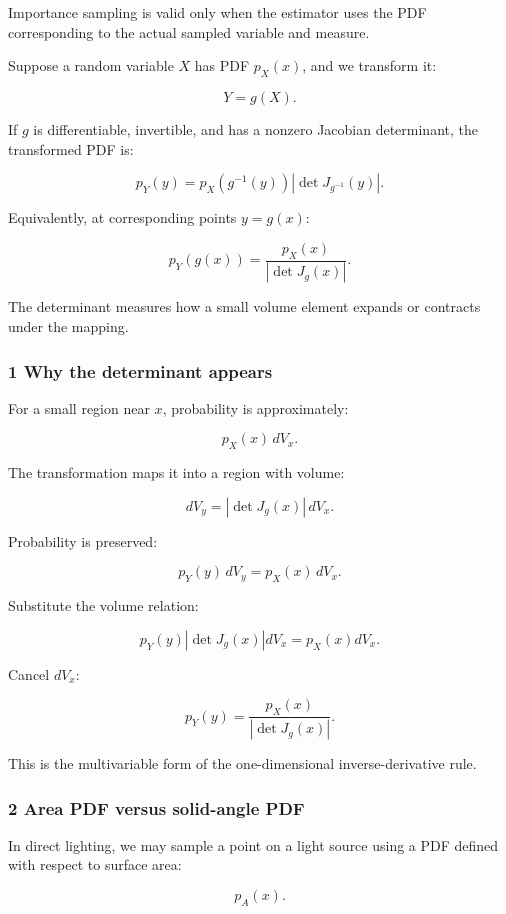 Importance sampling is valid only when the estimator uses the PDF corresponding to the actual sampled variable and measure.

Suppose a random variable \(X\) has PDF \(p_X(x)\), and we transform it:

\[
 Y=g(X).
\]

If \(g\) is differentiable, invertible, and has a nonzero Jacobian determinant, the transformed PDF is:

\[
 \boxed{ p_Y(y) = p_X(g^{-1}(y)) \left|\det J_{g^{-1}}(y)\right| }.
\]

Equivalently, at corresponding points \(y=g(x)\):

\[
 \boxed{ p_Y(g(x)) = \frac{p_X(x)}{|\det J_g(x)|} }.
\]

The determinant measures how a small volume element expands or contracts under the mapping.

\subsubsection{1 Why the determinant appears}\label{02-foundations-ii-ch029-why-the-determinant-appears}

For a small region near \(x\), probability is approximately:

\[
 p_X(x)\,dV_x.
\]

The transformation maps it into a region with volume:

\[
 dV_y= |\det J_g(x)|\,dV_x.
\]

Probability is preserved:

\[
 p_Y(y)\,dV_y=p_X(x)\,dV_x.
\]

Substitute the volume relation:

\[
 p_Y(y) |\det J_g(x)|dV_x = p_X(x)dV_x.
\]

Cancel \(dV_x\):

\[
 p_Y(y)= \frac{p_X(x)}{|\det J_g(x)|}.
\]

This is the multivariable form of the one-dimensional inverse-derivative rule.

\subsubsection{2 Area PDF versus solid-angle PDF}\label{02-foundations-ii-ch029-area-pdf-versus-solid-angle-pdf}

In direct lighting, we may sample a point on a light source using a PDF defined with respect to surface area:

\[
 p_A(x).
\]

